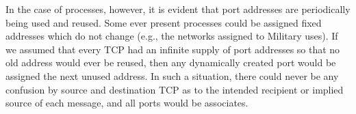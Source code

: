 \documentclass[12pt]{article}
\begin{document}
\begin{enumerate}
\begin{enumerate}[label=(\alph*)]
In the case of processes, however, it is evident that port addresses are periodically being used and reused. Some ever present processes could be assigned fixed addresses which do not change (e.g., the networks assigned to Military uses). If we assumed that every TCP had an infinite supply of port addresses so that no old address would ever be reused, then any dynamically created port would be assigned the next unused address. In such a situation, there could never be any confusion by source and destination TCP as to the intended recipient or implied source of each message, and all ports would be associates.
\end{enumerate} %

\end{enumerate}
\end{document}
